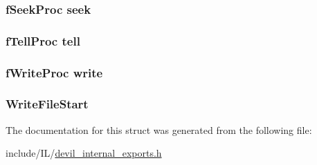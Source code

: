 \hypertarget{struct_s_i_o_a9734eede77c6c81945c04c9c8e427b53}{
\subsubsection[{seek}]{\setlength{\rightskip}{0pt plus 5cm}f\-Seek\-Proc seek}}\label{struct_s_i_o_a9734eede77c6c81945c04c9c8e427b53}
\hypertarget{struct_s_i_o_ac9e7b5d23d9c678b923ad470fd50f477}{
\subsubsection[{tell}]{\setlength{\rightskip}{0pt plus 5cm}f\-Tell\-Proc tell}}\label{struct_s_i_o_ac9e7b5d23d9c678b923ad470fd50f477}
\hypertarget{struct_s_i_o_a9ed6c0e54e1f68ab4b0c553593b4d175}{
\subsubsection[{write}]{\setlength{\rightskip}{0pt plus 5cm}f\-Write\-Proc write}}\label{struct_s_i_o_a9ed6c0e54e1f68ab4b0c553593b4d175}
\hypertarget{struct_s_i_o_a57300546bbca3a4e10398880f97b67c7}{
\subsubsection[{Write\-File\-Start}]{ Write\-File\-Start}}\label{struct_s_i_o_a57300546bbca3a4e10398880f97b67c7}


The documentation for this struct was generated from the following file\-:\begin{DoxyCompactItemize}
\item 
include/\-I\-L/\hyperlink{devil__internal__exports_8h}{devil\-\_\-internal\-\_\-exports.\-h}\end{DoxyCompactItemize}

